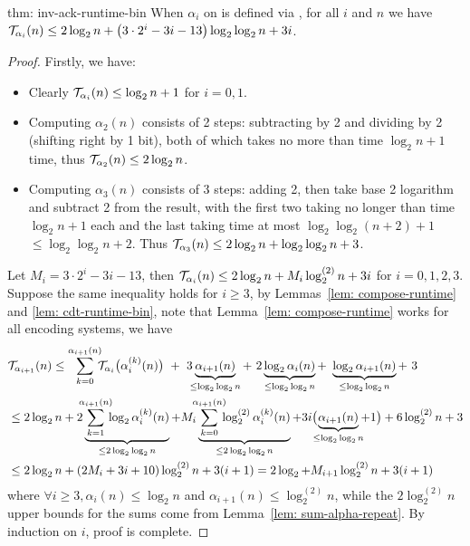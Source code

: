 \begin{usethmcounterof}{thm: inv-ack-runtime-bin}
	When $\alpha_i$ on  is defined via , for all $i$ and $n$ we have $\mathcal{T}_{\alpha_i}(n) \le 2\log_2n + \left(3\cdot 2^i - 3i - 13\right)\log_2\log_2n + 3i$.
\end{usethmcounterof} 

\begin{proof}
	Firstly, we have:
	\begin{itemize}
		\item Clearly $\mathcal{T}_{\alpha_i}(n)\le \log_2n + 1$ for $i = 0, 1$.
		\item Computing $\alpha_2(n)$ consists of 2 steps: subtracting by 2 and dividing by 2 (shifting right by 1 bit), both of which takes no more than time $\log_2n + 1$ time, thus $\mathcal{T}_{\alpha_2}(n)\le 2\log_2n$.
		\item Computing $\alpha_3(n)$ consists of 3 steps: adding 2, then take base 2 logarithm and subtract 2 from the result, with the first two taking no longer than time $\log_2n + 1$ each and the last taking time at most $\log_2\log_2(n+2) + 1$ $\le \log_2\log_2 n + 2$. Thus $\mathcal{T}_{\alpha_3}(n)\le 2\log_2n + \log_2\log_2n + 3$.
	\end{itemize}
  Let $M_i = 3\cdot 2^i - 3i - 13$, then $\mathcal{T}_{\alpha_i}(n)\le 2\log_2n + M_i\log_2^{(2)}n + 3i$ for $i = 0, 1, 2, 3$.
	Suppose the same inequality holds for $i\ge 3$, by Lemmas~\ref{lem: compose-runtime} and \ref{lem: cdt-runtime-bin}, note that Lemma~\ref{lem: compose-runtime} works for all encoding systems, we have
	\begin{equation*}
	\begin{aligned}
	& \runtime_{\alpha_{i+1}}(n) \le
	\sum_{k=0}^{\alpha_{i+1}(n)} \hspace{-5pt} \runtime_{\alpha_i}\big(\alpha_i^{(k)}(n)\big)
	\ + \ 3\hspace{-4pt}\underbrace{\alpha_{i+1}(n)}_{\le \log_2\log_2n}
	+ \ 2\underbrace{\log_2\alpha_i(n)}_{\le \log_2\log_2n}
	+ \ \underbrace{\log_2\alpha_{i+1}(n)}_{\le \log_2\log_2n} + \ 3 \\
	& \le 2\log_2n
	+ 2\underbrace{\hspace{-5pt}\sum_{k=1}^{\alpha_{i+1}(n)}\hspace{-5pt} \log_2\alpha_i^{(k)}(n)}_{\le 2\log_2\log_2n}
	+ M_i\underbrace{\hspace{-5pt}\sum_{k=0}^{\alpha_{i+1}(n)}\hspace{-5pt} \log_2^{(2)}\alpha_i^{(k)}(n)}_{\le 2\log_2\log_2n}
	+ 3i\big(\hspace{-5.5pt}\underbrace{\alpha_{i+1}(n)}_{\le \log_2\log_2n}\hspace{-4pt} + 1\big) + 6\log_2^{(2)}n + 3 \\
	& \le 2\log_2n + (2M_i + 3i + 10)\log_2^{(2)}n + 3(i + 1)
	= 2\log_2 + M_{i+1}\log_2^{(2)}n + 3(i + 1)
	\end{aligned}
	\end{equation*}
	where $\forall i\ge 3, \alpha_i(n)\le \log_2n$ and $\alpha_{i+1}(n)\le \log_2^{(2)}n$, while the $2\log_2^{(2)}n$ upper bounds for the sums come from Lemma~\ref{lem: sum-alpha-repeat}.
	By induction on $i$, proof is complete.
\end{proof}

